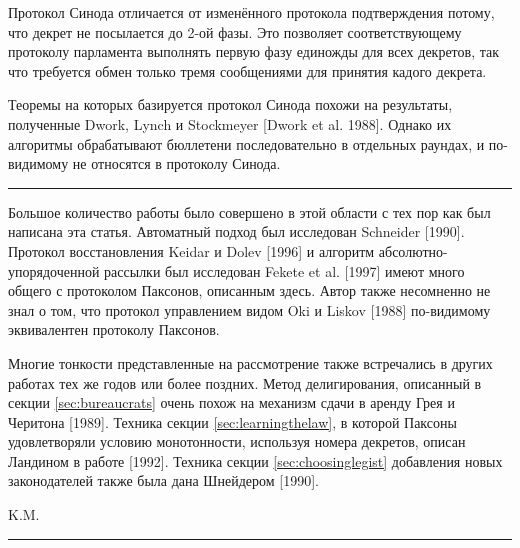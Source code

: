 \documentclass[12pt, a4paper]{article} %
\begin{document}
Протокол Синода отличается от изменённого протокола подтверждения потому, что декрет не посылается до 2-ой фазы. Это позволяет соответствующему протоколу парламента выполнять первую фазу единожды для всех декретов, так что требуется обмен только тремя сообщениями для принятия кадого декрета. 

Теоремы на которых базируется протокол Синода похожи на результаты, полученные Dwork, Lynch и Stockmeyer [Dwork et al. 1988]. Однако их алгоритмы обрабатывают бюллетени последовательно в отдельных раундах, и по-видимому не относятся в протоколу Синода.

\noindent\rule{\textwidth}{0.4pt}
Большое количество работы было совершено в этой области с тех пор как был написана эта статья. Автоматный подход был исследован Schneider [1990]. Протокол восстановления Keidar и Dolev [1996] и алгоритм абсолютно-упорядоченной рассылки был исследован Fekete et al. [1997] имеют много общего с протоколом Паксонов, описанным здесь. Автор также несомненно не знал о том, что протокол управлением видом Oki и Liskov [1988] по-видимому эквивалентен протоколу Паксонов.

Многие тонкости представленные на рассмотрение также встречались в других работах тех же годов или более поздних. Метод делигирования, описанный в секции \ref{sec:bureaucrats} очень похож на механизм сдачи в аренду Грея и Черитона [1989].  Техника секции \ref{sec:learningthelaw}, в которой Паксоны удовлетворяли условию монотонности, используя номера декретов, описан Ландином в работе [1992].  Техника секции \ref{sec:choosinglegist} добавления новых законодателей также была дана Шнейдером [1990].\\
\begin{flushright}
    K.M.
\end{flushright}

\noindent\rule{\textwidth}{0.4pt}
\end{document}
